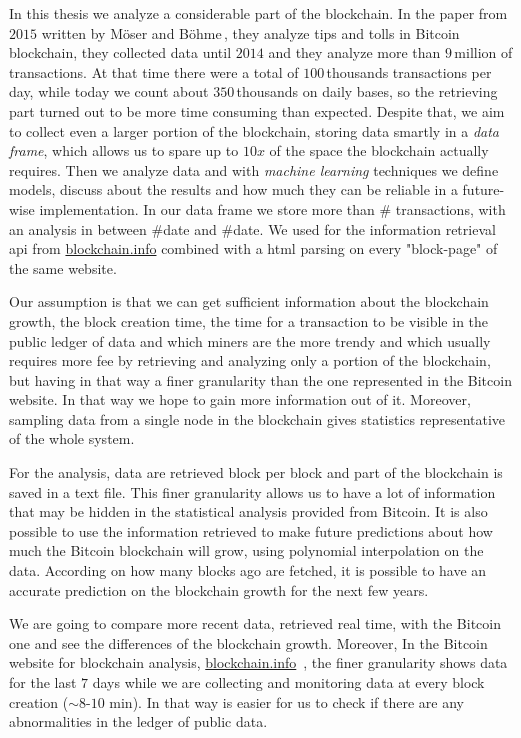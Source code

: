 \documentclass[USenglish]{uit-thesis}
\begin{document}
In this thesis we analyze a considerable part of the blockchain.
In the paper from $2015$ written by Möser and Böhme\,\cite{Moser2015},
they analyze tips and tolls in Bitcoin blockchain, they collected data until $2014$
and they analyze more than $9$\,million of transactions.
At that time there were a total of $100$\,thousands
transactions per day, while today we count about $350$\,thousands
on daily bases, so the retrieving part turned
out to be more time consuming than expected.
Despite that, we aim to collect even
a larger portion of the blockchain, storing data smartly in a
\emph{data frame}, which allows us to spare
up to $10x$ of the space the blockchain actually requires. Then we analyze data
and with \emph{machine learning} techniques we define models, discuss about
the results and how much they can be reliable in a future-wise implementation.
In our data frame we store more than \# transactions, with an analysis in between
\#date and \#date.
We used for the information retrieval \gls{api} from \url{blockchain.info}
combined with a \gls{html} parsing on every "block-page"
of the same website.

Our assumption is that we can get sufficient information about the
blockchain growth, the block creation time, the time for a transaction to be visible
in the public ledger of data and which miners are the more trendy and
which usually requires more fee by retrieving and analyzing only a portion
of the blockchain, but having in that way a finer
granularity than the one represented in the Bitcoin website. In that
way we hope to gain more information out of it.
Moreover, sampling data from a single node in the blockchain gives statistics
representative of the whole system.

For the analysis, data are retrieved block per block and part of the blockchain
is saved in a text file. This finer granularity allows us to have
a lot of information that may be hidden in the statistical analysis
provided from Bitcoin. It is also possible to use the information retrieved
to make future predictions about how much the 
Bitcoin blockchain will grow, using polynomial interpolation on the data. According
on how many blocks ago are fetched, it is possible to have an accurate prediction
on the blockchain growth for the next few years.

We are going to compare more recent data, retrieved real time, with the Bitcoin one and see the differences of the
blockchain growth. Moreover, In the Bitcoin website for blockchain analysis,
\url{blockchain.info}~\cite{bitcoin_blockchain}, the finer granularity
shows data for the last $7$ days while we are collecting and monitoring data
at every block creation ($\sim8$-$10$ min). In that way is easier for us to check
if there are any abnormalities in the ledger of public data.
\end{document}
